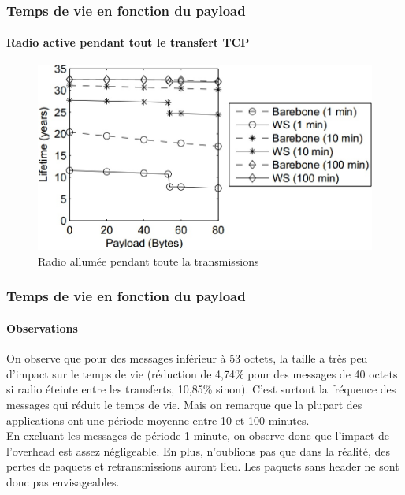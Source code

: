 \begin{frame}
 \frametitle{Temps de vie en fonction du payload}
 \framesubtitle{Radio active pendant tout le transfert TCP}
 \begin{figure}
  \centering
  \includegraphics[scale=\radiosca]{figures/radioon.jpg}
  \caption{Radio allumée pendant toute la transmissions}
 \end{figure} 
\end{frame}

\begin{frame}
 \frametitle{Temps de vie en fonction du payload}
 \framesubtitle{Observations}
 On observe que pour des messages inférieur à 53 octets, la taille a très peu d'impact sur le temps de vie
 (réduction de 4,74\% pour des messages de 40 octets si radio éteinte entre les transferts, 10,85\% sinon).
 C'est surtout la fréquence des messages qui réduit le temps de vie. Mais on remarque que la plupart des applications ont une période moyenne entre 10 et 100 minutes.\\
 \vspace{5mm}
 En excluant les messages de période 1 minute, on observe donc que l'impact de l'overhead est assez négligeable.
 En plus, n'oublions pas que dans la réalité, des pertes de paquets et retransmissions auront lieu.
 Les paquets sans header ne sont donc pas envisageables.
\end{frame}

